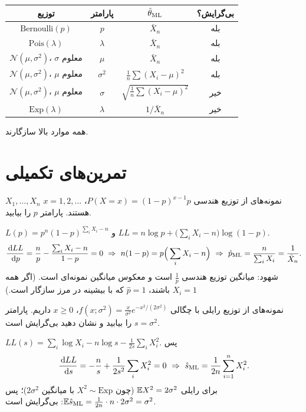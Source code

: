 \begin{summarybox}
\begin{center}
\renewcommand{\arraystretch}{1.5}
\begin{tabular}{c|c|c|c}
توزیع & پارامتر & $\hat\theta_{\mathrm{ML}}$ & بی‌گرایش؟\\\hline
$\mathrm{Bernoulli}(p)$ & $p$ & $\bar X_n$ & بله\\
$\mathrm{Pois}(\lambda)$ & $\lambda$ & $\bar X_n$ & بله\\
$\mathcal N(\mu,\sigma^2)$، $\sigma$ معلوم & $\mu$ & $\bar X_n$ & بله\\
$\mathcal N(\mu,\sigma^2)$، $\mu$ معلوم & $\sigma^2$ & $\frac1n\sum(X_i-\mu)^2$ & بله\\
$\mathcal N(\mu,\sigma^2)$، $\mu$ معلوم & $\sigma$ & $\sqrt{\frac1n\sum(X_i-\mu)^2}$ & خیر\\
$\mathrm{Exp}(\lambda)$ & $\lambda$ & $1/\bar X_n$ & خیر
\end{tabular}
\end{center}
همه موارد بالا سازگارند.
\end{summarybox}

\section{تمرین‌های تکمیلی}

\begin{exercise}
$X_1,\ldots,X_n$ نمونه‌های  از توزیع هندسی $P(X=x)=(1-p)^{x-1}p$، $x=1,2,\ldots$ هستند.  پارامتر $p$ را بیابید.
\end{exercise}
\begin{solution}
$L(p)=p^n(1-p)^{\sum_iX_i-n}$ و $LL=n\log p+\big(\sum_iX_i-n\big)\log(1-p)$.
\[
\frac{\dd LL}{\dd p}=\frac np-\frac{\sum_iX_i-n}{1-p}=0\ \Rightarrow\ n(1-p)=p\Big(\sum_iX_i-n\Big)\ \Rightarrow\ \hat p_\ML=\frac{n}{\sum_iX_i}=\frac1{\bar X_n}.
\]
شهود: میانگین توزیع هندسی $\frac1p$ است و  معکوس میانگین نمونه‌ای است. (اگر همه $X_i=1$ باشند، $\hat p=1$ که با بیشینه در مرز سازگار است.)
\end{solution}

\begin{exercise}
نمونه‌های  از توزیع رایلی با چگالی $f(x;\sigma^2)=\frac{x}{\sigma^2}e^{-x^2/(2\sigma^2)}$، $x\ge0$ داریم.  پارامتر $s=\sigma^2$ را بیابید و نشان دهید بی‌گرایش است.
\end{exercise}
\begin{solution}
$LL(s)=\sum_i\log X_i-n\log s-\frac{1}{2s}\sum_iX_i^2$. پس
\[
\frac{\,\mathrm{d} LL}{\,\mathrm{d} s}=-\frac ns+\frac{1}{2s^2}\sum_iX_i^2=0\ \Rightarrow\ \hat s_{\mathrm{ML}}=\frac{1}{2n}\sum_{i=1}^nX_i^2 .
\]
برای رایلی $\mathbb{E} X^2=2\sigma^2$ (چون $X^2\sim\mathrm{Exp}$ با میانگین $2\sigma^2$)؛ پس $\mathbb{E}\hat s_{\mathrm{ML}}=\frac{1}{2n}\cdot n\cdot2\sigma^2=\sigma^2$: بی‌گرایش است.
\end{solution}

